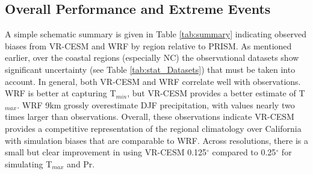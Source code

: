 \subsection{Overall Performance and Extreme Events}

A simple schematic summary is given in Table \ref{tab:summary} indicating observed biases from VR-CESM and WRF by region relative to PRISM. As mentioned earlier, over the coastal regions (especially NC) the observational datasets show significant uncertainty (see Table \ref{tab:stat_Datasets}) that must be taken into account. In general, both VR-CESM and WRF correlate well with observations. WRF is better at capturing T$_{min}$, but VR-CESM provides a better estimate of T$_{max}$.  WRF 9km grossly overestimate DJF precipitation, with values nearly two times larger than observations.  Overall, these observations indicate VR-CESM provides a competitive representation of the regional climatology over California with simulation biases that are comparable to WRF. Across resolutions, there is a small but clear improvement in using VR-CESM 0.125$^\circ$ compared to 0.25$^\circ$ for simulating T$_{max}$ and Pr.

